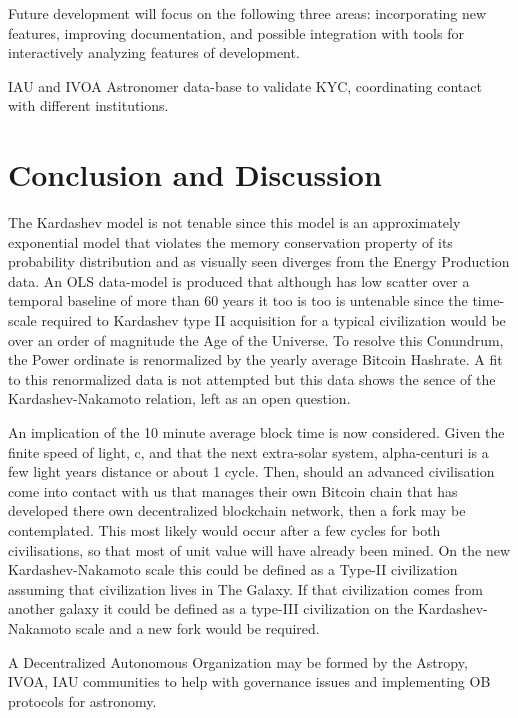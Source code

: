 \documentclass[final,5p,times,twocolumn,authoryear]{elsarticle}
\begin{document}
Future development will focus on the following three areas: incorporating
new features, improving documentation, and 
possible integration with tools for interactively analyzing features of development.

IAU and IVOA Astronomer data-base to validate KYC, coordinating contact with different institutions. 

\section{Conclusion and Discussion}
\label{sec:conc}
The Kardashev model is not tenable since this model is an approximately exponential model that violates the memory conservation property of its probability distribution and as visually seen diverges from the Energy Production data. An OLS data-model is produced that although has low scatter over a temporal baseline of more than 60 years it too is too is untenable since the time-scale required to Kardashev type II acquisition for a typical civilization would be over an order of magnitude the Age of the Universe. To resolve this Conundrum, the Power ordinate is renormalized by the yearly average Bitcoin Hashrate. A fit to this renormalized data is not attempted but this data shows the sence of the Kardashev-Nakamoto relation, left as an open question. 

An implication of the 10 minute average block time is now considered. Given the finite speed of light, c, and that the next extra-solar system, alpha-centuri is a few light years distance or about 1 cycle.  Then, should an advanced civilisation come into contact with us that manages their own Bitcoin chain that has developed there own decentralized blockchain network, then a fork may be contemplated. This most likely would occur after a few cycles for both civilisations, so that most of unit value  will have already been mined. On the new Kardashev-Nakamoto scale this could be defined as a Type-II civilization assuming that civilization lives in The Galaxy. If that civilization comes from another galaxy it could be defined as a type-III civilization on the Kardashev-Nakamoto scale and a new fork would be required.

A Decentralized Autonomous Organization may be formed by the Astropy, IVOA, IAU communities to help with governance issues and implementing OB protocols for astronomy.
\end{document}
